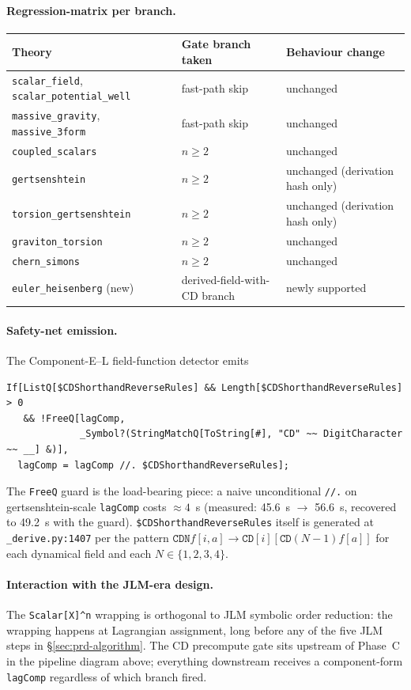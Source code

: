 \paragraph{Regression-matrix per branch.}
\begin{center}
\begin{tabular}{lll}
\hline
Theory & Gate branch taken & Behaviour change \\
\hline
\texttt{scalar\_field}, \texttt{scalar\_potential\_well} & fast-path skip & unchanged \\
\texttt{massive\_gravity}, \texttt{massive\_3form} & fast-path skip & unchanged \\
\texttt{coupled\_scalars} & $n\ge 2$ & unchanged \\
\texttt{gertsenshtein} & $n\ge 2$ & unchanged (derivation hash only) \\
\texttt{torsion\_gertsenshtein} & $n\ge 2$ & unchanged (derivation hash only) \\
\texttt{graviton\_torsion} & $n\ge 2$ & unchanged \\
\texttt{chern\_simons} & $n\ge 2$ & unchanged \\
\texttt{euler\_heisenberg} (new) & derived-field-with-CD branch & newly supported \\
\hline
\end{tabular}
\end{center}

\paragraph{Safety-net emission.} The Component-E--L field-function detector emits
\begin{verbatim}
If[ListQ[$CDShorthandReverseRules] && Length[$CDShorthandReverseRules] > 0
   && !FreeQ[lagComp,
             _Symbol?(StringMatchQ[ToString[#], "CD" ~~ DigitCharacter ~~ __] &)],
  lagComp = lagComp //. $CDShorthandReverseRules];
\end{verbatim}
The \texttt{FreeQ} guard is the load-bearing piece: a naive unconditional \verb|//.| on gertsenshtein-scale \verb|lagComp| costs $\approx 4$~s (measured: 45.6~s $\rightarrow$ 56.6~s, recovered to 49.2~s with the guard). \verb|$CDShorthandReverseRules| itself is generated at \verb|_derive.py:1407| per the pattern $\texttt{CDN}f[i,a] \to \texttt{CD}[i][\texttt{CD}(N{-}1)f[a]]$ for each dynamical field and each $N \in \{1,2,3,4\}$.

\paragraph{Interaction with the JLM-era design.} The \texttt{Scalar[X]\textasciicircum n} wrapping is orthogonal to JLM symbolic order reduction: the wrapping happens at Lagrangian assignment, long before any of the five JLM steps in \S\ref{sec:prd-algorithm}. The CD precompute gate sits upstream of Phase~C in the pipeline diagram above; everything downstream receives a component-form \verb|lagComp| regardless of which branch fired.

